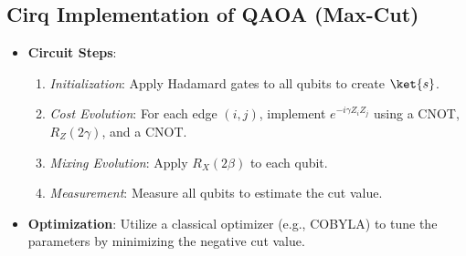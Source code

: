 \begin{multicols}{3}
                  \section*{Cirq Implementation of QAOA (Max-Cut)}
                  \begin{itemize}[leftmargin=*,nosep,topsep=0pt]
                    \item \textbf{Circuit Steps}:
                      \begin{enumerate}[nosep]
                        \item \textit{Initialization}: Apply Hadamard gates to all qubits to create \(\ket{s}\).
                        \item \textit{Cost Evolution}: For each edge \((i,j)\), implement
                          $e^{-i\gamma Z_i Z_j}$ using a CNOT, $R_Z(2\gamma)$, and a CNOT.
                        \item \textit{Mixing Evolution}: Apply \(R_X(2\beta)\) to each qubit.
                        \item \textit{Measurement}: Measure all qubits to estimate the cut value.
                      \end{enumerate}
                    \item \textbf{Optimization}: Utilize a classical optimizer (e.g., COBYLA) to tune the parameters by minimizing the negative cut value.
                  \end{itemize}


\end{multicols}
